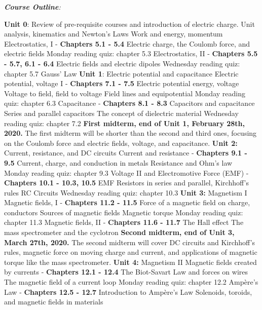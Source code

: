 \documentclass[10pt]{article}
\begin{document}
\clearpage
\small
\textit{\textbf{Course Outline}:}
\begin{outline}[enumerate]
\1 \textbf{Unit 0}: Review of pre-requisite courses and introduction of electric charge.
\2 Unit analysis, kinematics and Newton's Laws
\2 Work and energy, momentum
\2 Electrostatics, I - \textbf{Chapters 5.1 - 5.4}
\3 Electric charge, the Coulomb force, and electric fields
\3 Monday reading quiz: chapter 5.3
\2 Electrostatics, II - \textbf{Chapters 5.5 - 5.7, 6.1 - 6.4}
\3 Electric fields and electric dipoles
\3 Wednesday reading quiz: chapter 5.7
\3 Gauss' Law
\1 \textbf{Unit 1}: Electric potential and capacitance
\2 Electric potential, voltage I - \textbf{Chapters 7.1 - 7.5}
\3 Electric potential energy, voltage
\3 Voltage to field, field to voltage
\3 Field lines and equipotential
\3 Monday reading quiz: chapter 6.3
\2 Capacitance - \textbf{Chapters 8.1 - 8.3}
\3 Capacitors and capacitance
\3 Series and parallel capacitors
\3 The concept of dielectric material
\3 Wednesday reading quiz: chapter 7.2
\1 \textbf{First midterm, end of Unit 1, February 28th, 2020.} The first midterm will be shorter than the second and third ones, focusing on the Coulomb force and electric fields, voltage, and capacitance.
\1 \textbf{Unit 2:} Current, resistance, and DC circuits
\2 Current and resistance - \textbf{Chapters 9.1 - 9.5}
\3 Current, charge, and conduction in metals
\3 Resistance and Ohm's law
\3 Monday reading quiz: chapter 9.3
\2 Voltage II and Electromotive Force (EMF) - \textbf{Chapters 10.1 - 10.3, 10.5}
\3 EMF
\3 Resistors in series and parallel, Kirchhoff's rules
\3 RC Circuits
\3 Wednesday reading quiz: chapter 10.3
\1 \textbf{Unit 3:} Magnetism I
\2 Magnetic fields, I - \textbf{Chapters 11.2 - 11.5}
\3 Force of a magnetic field on charge, conductors
\3 Sources of magnetic fields
\3 Magnetic torque
\3 Monday reading quiz: chapter 11.3
\2 Magnetic fields, II - \textbf{Chapters 11.6 - 11.7}
\3 The Hall effect
\3 The mass spectrometer and the cyclotron
\1 \textbf{Second midterm, end of Unit 3, March 27th, 2020.} The second midterm will cover DC circuits and Kirchhoff's rules, magnetic force on moving charge and current, and applications of magnetic torque like the mass spectrometer.
\1 \textbf{Unit 4:} Magnetism II
\2 Magnetic fields created by currents - \textbf{Chapters 12.1 - 12.4}
\3 The Biot-Savart Law and forces on wires
\3 The magnetic field of a current loop
\3 Monday reading quiz: chapter 12.2
\2 Amp\`{e}re's Law - \textbf{Chapters 12.5 - 12.7}
\3 Introduction to Amp\`{e}re's Law
\3 Solenoids, toroids, and magnetic fields in materials

\end{outline}
\end{document}
